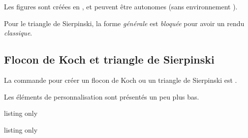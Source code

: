 \begin{importantblock}
Les figures sont créées en \TikZ, et peuvent être autonomes (sans environnement ).

Pour le triangle de Sierpinski, la forme \textit{générale} est \textit{bloquée} pour avoir un rendu \textit{classique}.
\end{importantblock}

\subsection{Flocon de Koch et triangle de Sierpinski}

\begin{tipblock}
La commande pour créer un flocon de Koch ou un triangle de Sierpinski est .

Les éléments de personnalisation sont présentés un peu plus bas.
\end{tipblock}

\begin{PresCodeTexPL}{listing only}

\begin{tikzpicture}
	\FractaleTikz*[Type=Koch,clés]
\end{tikzpicture}
\end{PresCodeTexPL}

\begin{PresCodeTexPL}{listing only}

\begin{tikzpicture}
	\FractaleTikz[Type=Sierp,clés]
\end{tikzpicture}
\end{PresCodeTexPL}

